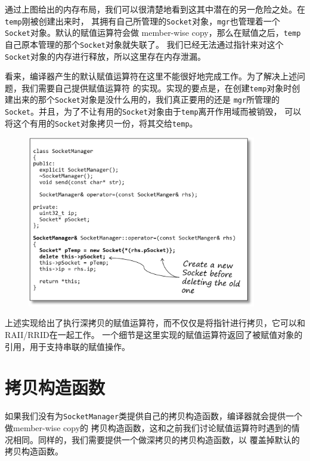 \documentclass[12pt]{article}
\begin{document}
\indent{}通过上图给出的内存布局，我们可以很清楚地看到这其中潜在的另一危险之处。在\texttt{temp}刚被创建出来时，
其拥有自己所管理的\texttt{Socket}对象，\texttt{mgr}也管理着一个\texttt{Socket}对象。默认的赋值运算符会做
member-wise copy，那么在赋值之后，\texttt{temp}自己原本管理的那个\texttt{Socket}对象就失联了。
我们已经无法通过指针来对这个\texttt{Socket}对象的内存进行释放，所以这里存在内存泄漏。

\indent{}看来，编译器产生的默认赋值运算符在这里不能很好地完成工作。为了解决上述问题，我们需要自己提供赋值运算符
的实现。实现的要点是，在创建\texttt{temp}对象时创建出来的那个\texttt{Socket}对象是没什么用的，我们真正要用的还是
\texttt{mgr}所管理的\texttt{Socket}。并且，为了不让有用的\texttt{Socket}对象由于\texttt{temp}离开作用域而被销毁，
可以将这个有用的\texttt{Socket}对象拷贝一份，将其交给\texttt{temp}。

\begin{figure}[h]
\centering
\includegraphics[width=10cm]{./imgs/image.C28HS0.png}
\end{figure}

\indent{}上述实现给出了执行深拷贝的赋值运算符，而不仅仅是将指针进行拷贝，它可以和 RAII/RRID在一起工作。
一个细节是这里实现的赋值运算符返回了被赋值对象的引用，用于支持串联的赋值操作。

\section{拷贝构造函数}
\indent{}如果我们没有为\texttt{SocketManager}类提供自己的拷贝构造函数，编译器就会提供一个做member-wise copy的
拷贝构造函数，这和之前我们讨论赋值运算符时遇到的情况相同。同样的，我们需要提供一个做深拷贝的拷贝构造函数，以
覆盖掉默认的拷贝构造函数。
\end{document}
